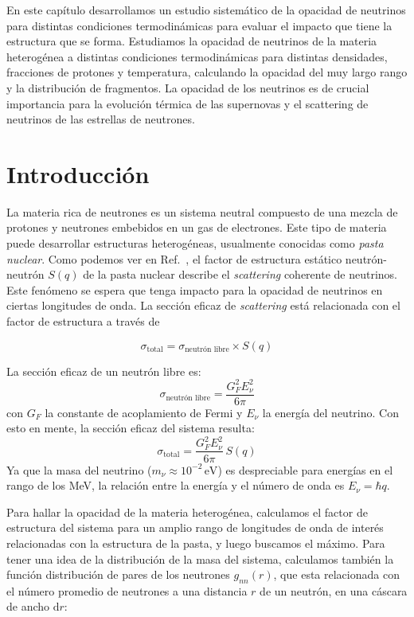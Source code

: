 En este capítulo desarrollamos un estudio sistemático de la opacidad de neutrinos para distintas condiciones termodinámicas para evaluar el impacto que tiene la estructura que se forma.
Estudiamos la opacidad de neutrinos de la materia heterogénea a distintas condiciones termodinámicas para distintas densidades, fracciones de protones y temperatura, calculando la opacidad del muy largo rango y la distribución de fragmentos.
La opacidad de los neutrinos es de crucial importancia para la evolución térmica de las supernovas y el scattering de neutrinos de las estrellas de neutrones.

\section{Introducción}\label{sc:intro}
La materia rica de neutrones es un sistema neutral compuesto de una mezcla de protones y neutrones embebidos en un gas de electrones.
Este tipo de materia puede desarrollar estructuras heterogéneas, usualmente conocidas como \emph{pasta nuclear}.
Como podemos ver en Ref.~\cite{horowitz_nonuniform_2004, horowitz_neutrino-pasta_2004}, el factor de estructura estático neutrón-neutrón $S(q)$ de la pasta nuclear describe el \emph{scattering} coherente de neutrinos.
Este fenómeno se espera que tenga impacto para la opacidad de neutrinos en ciertas longitudes de onda.
La sección eficaz de \emph{scattering} está relacionada con el factor de estructura a través de

\begin{equation}
 \sigma_{\text{total}} = \sigma_{\text{neutrón libre}} \times S(q)
\end{equation}

La sección eficaz de un neutrón libre es:
\begin{equation}
\sigma_{\text{neutrón libre}} = \frac{G_F^2E_\nu^2}{6\pi}
\end{equation}
con $G_F$ la constante de acoplamiento de Fermi y $E_\nu$ la energía del neutrino.
Con esto en mente, la sección eficaz del sistema resulta:
\begin{equation}
\sigma_{\text{total}} = \frac{G_F^2E_\nu^2}{6\pi}\, S(q)
\label{eq:opac}
\end{equation}
Ya que la masa del neutrino ($m_\nu \approx 10^{-2}\,\text{eV}$) es despreciable para energías en el rango de los MeV, la relación entre la energía y el número de onda es $E_\nu = \hbar q$.

Para hallar la opacidad de la materia heterogénea, calculamos el factor de estructura del sistema para un amplio rango de longitudes de onda de interés relacionadas con la estructura de la pasta, y luego buscamos el máximo.
Para tener una idea de la distribución de la masa del sistema, calculamos también la función distribución de pares de los neutrones $g_{nn}(r)$, que esta relacionada con el número promedio de neutrones a una distancia $r$ de un neutrón, en una cáscara de ancho $\text{d}r$:

